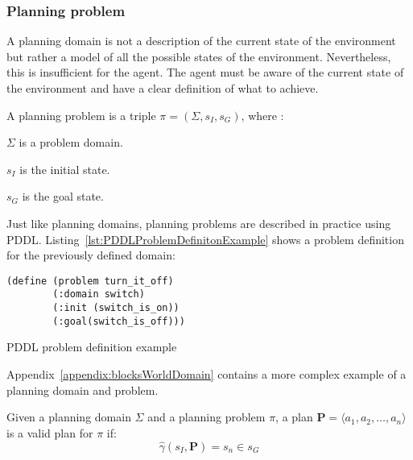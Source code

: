 \subsubsection{Planning problem}
A planning domain is not a description of the current state of the environment 
but rather a model of all the possible states of the environment. 
Nevertheless, this is insufficient for the agent. The agent must be aware 
of the current state of the environment and have a clear definition 
of what to achieve.

\begin{Tdef}
    A planning problem is a triple $\pi = (\Sigma,s_I,s_G)$, where :
    \vspace{-0.5em}
    \begin{compactitem}
        \item 
        $\Sigma$ is a problem domain.
        
        \item 
        $s_I$ is the initial state.
        
        \item 
        $s_G$ is the goal state.
    \end{compactitem}
    \vspace{-0.5em}
\end{Tdef}
\vspace{-0.5em}
Just like planning domains, planning problems are described in practice using PDDL. 
Listing~\ref{lst:PDDLProblemDefinitonExample} shows a problem definition for the previously defined domain:
\begin{Listing}
    \begin{lstlisting}[language=PDDL]
    (define (problem turn_it_off)
        (:domain switch)
        (:init (switch_is_on))
        (:goal(switch_is_off)))
  \end{lstlisting}
    \caption{PDDL problem definition example}
    \label{lst:PDDLProblemDefinitonExample}
\end{Listing}

Appendix~\ref{appendix:blocksWorldDomain} contains a more complex example of a planning domain and problem.

\begin{Tdef}
    Given a planning domain $\Sigma$ and a planning problem $\pi$,
    a plan $\mathbf{P} = \langle a_1,a_2,\dots,a_n\rangle$ is a valid plan for $\pi$ if:
    $$\hat{\gamma}(s_I,\mathbf{P}) = s_n \in s_G$$
\end{Tdef}

